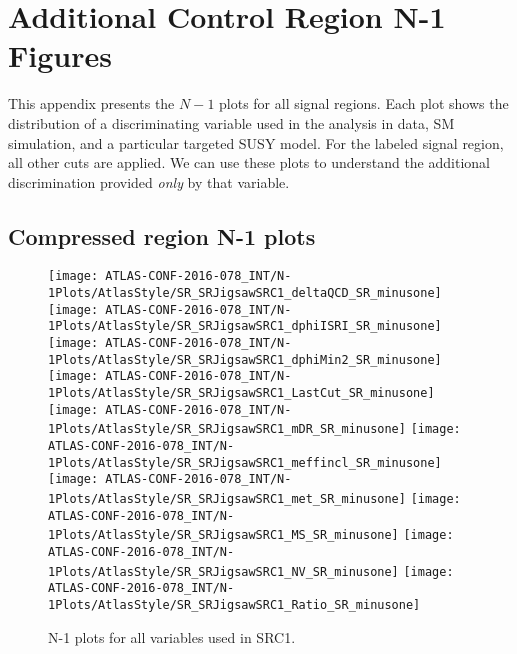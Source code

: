 

\chapter{Additional Control Region N-1 Figures}
\label{app:n-1_plots}

This appendix presents the $N-1$ plots for all signal regions.
Each plot shows the distribution of a discriminating variable used in the analysis in data, SM simulation, and a particular targeted SUSY model.
For the labeled signal region, all other cuts are applied.
We can use these plots to understand the additional discrimination provided \textit{only} by that variable.


\section{Compressed region N-1 plots}

\begin{figure}[tbp]
\begin{center}
\texttt{[image: ATLAS-CONF-2016-078\_INT/N-1Plots/AtlasStyle/SR\_SRJigsawSRC1\_deltaQCD\_SR\_minusone]}
\texttt{[image: ATLAS-CONF-2016-078\_INT/N-1Plots/AtlasStyle/SR\_SRJigsawSRC1\_dphiISRI\_SR\_minusone]}
\texttt{[image: ATLAS-CONF-2016-078\_INT/N-1Plots/AtlasStyle/SR\_SRJigsawSRC1\_dphiMin2\_SR\_minusone]}
\texttt{[image: ATLAS-CONF-2016-078\_INT/N-1Plots/AtlasStyle/SR\_SRJigsawSRC1\_LastCut\_SR\_minusone]}
\texttt{[image: ATLAS-CONF-2016-078\_INT/N-1Plots/AtlasStyle/SR\_SRJigsawSRC1\_mDR\_SR\_minusone]}
\texttt{[image: ATLAS-CONF-2016-078\_INT/N-1Plots/AtlasStyle/SR\_SRJigsawSRC1\_meffincl\_SR\_minusone]}
\texttt{[image: ATLAS-CONF-2016-078\_INT/N-1Plots/AtlasStyle/SR\_SRJigsawSRC1\_met\_SR\_minusone]}
\texttt{[image: ATLAS-CONF-2016-078\_INT/N-1Plots/AtlasStyle/SR\_SRJigsawSRC1\_MS\_SR\_minusone]}
\texttt{[image: ATLAS-CONF-2016-078\_INT/N-1Plots/AtlasStyle/SR\_SRJigsawSRC1\_NV\_SR\_minusone]}
\texttt{[image: ATLAS-CONF-2016-078\_INT/N-1Plots/AtlasStyle/SR\_SRJigsawSRC1\_Ratio\_SR\_minusone]}
\end{center}
\caption{N-1 plots for all variables used in SRC1.}
\label{fig:SR_SRJigsawSRC1_deltaQCD_SR_minusone}
\end{figure}

